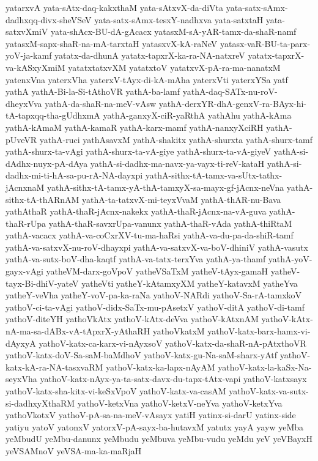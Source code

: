 {yatarxvA
yata-sAtx-daq-kakxthaM
yata-sAtxvX-da-diVta
yata-satx-sAmx-dadhxqq-divx-sheVSeV
yata-satx-sAmx-tesxY-nadhxva
yata-satxtaH
yata-satxvXmiV
yata-shAcx-BU-dA-gAcacx
yatasxM-sA-yAR-tamx-da-shaR-namf
yatasxM-sapx-shaR-na-mA-tarxtaH
yatasxvX-kA-raNeV
yatasx-vaR-BU-ta-parx-yoV-ja-kamf
yatatx-da-dhunA
yatatx-tapxrX-ka-ra-NA-natxreV
yatatx-tapxrX-va-kASxyXmiM
yatatxtatxvXM
yatatxtoV
yatatxvX-pA-ra-ma-nanatxM
yatenxVna
yaterxVha
yaterxV-tAyx-di-kA-mAha
yaterxVti
yaterxYSa
yatf
yathA
yathA-Bi-la-Si-tAthoVR
yathA-ba-lamf
yathA-daq-SATx-nu-roV-dheyxVva
yathA-da-shaR-na-meV-vAsw
yathA-derxYR-dhA-genxV-ra-BAyx-hi-tA-tapxqq-tha-gUdhxmA
yathA-ganxyX-ciR-yaRthA
yathAhu
yathA-kAma
yathA-kAmaM
yathA-kamaR
yathA-karx-mamf
yathA-nanxyXciRH
yathA-pUveVR
yathA-ruci
yathAsavxM
yathA-shakitx
yathA-shurxta
yathA-shurx-tamf
yathA-shurx-ta-vAgi
yathA-shurx-ta-vA-giye
yathA-shurx-ta-vA-giyeV
yathA-si-dAdhx-nuyx-pA-dAya
yathA-si-dadhx-ma-navx-ya-vayx-ti-reV-kataH
yathA-si-dadhx-mi-ti-hA-sa-pu-rA-NA-dayxpi
yathA-sithx-tA-tamx-va-sUtx-tathx-jAcnxnaM
yathA-sithx-tA-tamx-yA-thA-tamxyX-sa-mayx-gf-jAcnx-neVna
yathA-sithx-tA-thARnAM
yathA-ta-tatxvX-mi-teyxVvaM
yathA-thAR-nu-Bava
yathAthaR
yathA-thaR-jAcnx-nakekx
yathA-thaR-jAcnx-na-vA-guva
yathA-thaR-rUpa
yathA-thaR-savxrUpa-vanunx
yathA-thaR-vAda
yathA-thiRtaM
yathA-vacacx
yathA-va-coCxrXV-tu-ma-haRsi
yathA-va-du-pa-da-shiR-tamf
yathA-va-satxvX-nu-roV-dhayxpi
yathA-va-satxvX-va-boV-dhiniV
yathA-vasutx
yathA-va-sutx-boV-dha-kaqtf
yathA-va-tatx-terxYva
yathA-ya-thamf
yathA-yoV-gayx-vAgi
yatheVM-darx-goVpoV
yatheVSaTxM
yatheV-tAyx-gamaH
yatheV-tayx-Bi-dhiV-yateV
yatheVti
yatheY-kAtamxyXM
yatheY-katavxM
yatheYva
yatheY-veVha
yatheY-voV-pa-ka-raNa
yathoV-NARdi
yathoV-Sa-rA-tamxkoV
yathoV-ci-ta-vAgi
yathoV-didx-SaTx-mu-pAsetxV
yathoV-ditA
yathoV-di-tamf
yathoV-diteYH
yathoVkAtx
yathoV-kAtx-deVva
yathoV-kAtxnAM
yathoV-kAtx-nA-ma-sa-dABx-vA-tApxrX-yAthaRH
yathoVkatxM
yathoV-katx-barx-hamx-vi-dAyxyA
yathoV-katx-ca-karx-vi-nAyxsoV
yathoV-katx-da-shaR-nA-pAtxthoVR
yathoV-katx-doV-Sa-saM-baMdhoV
yathoV-katx-gu-Na-saM-sharx-yAtf
yathoV-katx-kA-ra-NA-tasxvaRM
yathoV-katx-ka-lapx-nAyAM
yathoV-katx-la-kaSx-Na-seyxVha
yathoV-katx-nAyx-ya-ta-satx-davx-du-tapx-tAtx-vapi
yathoV-katxsayx
yathoV-katx-sha-kitx-vi-keSxVpoV
yathoV-katx-va-casAM
yathoV-katx-va-sutx-si-dadhxyXthaRM
yathoV-ketxVna
yathoV-ketxV-neYva
yathoV-ketxYva
yathoVkotxV
yathoV-pA-sa-na-meV-vAsayx
yatiH
yatinx-si-darU
yatinx-side
yatiyu
yatoV
yatonxV
yatorxV-pA-sayx-ba-hutavxM
yatutx
yayA
yayw
yeMba
yeMbudU
yeMbu-danunx
yeMbudu
yeMbuva
yeMbu-vudu
yeMdu
yeV
yeVBayxH
yeVSAMnoV
yeVSA-ma-ka-maRjaH
}
